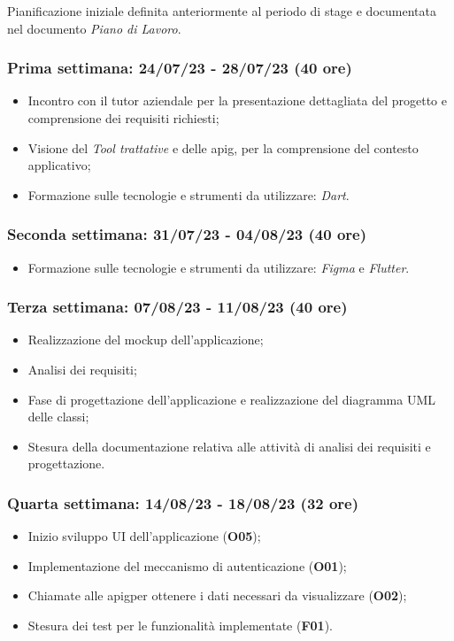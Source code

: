 Pianificazione iniziale definita anteriormente al periodo di stage e documentata nel documento \emph{Piano di Lavoro}.\\

\subsubsection{Prima settimana: 24/07/23 - 28/07/23 (40 ore)}
    \begin{itemize}
        \item Incontro con il tutor aziendale per la presentazione dettagliata del progetto e comprensione dei requisiti richiesti;
        \item Visione del \emph{Tool trattative} e delle \gls{apig}\glsoccur, per la comprensione del contesto applicativo;
        \item Formazione sulle tecnologie e strumenti da utilizzare: \emph{Dart}\cite{site:dart}.
    \end{itemize}
\subsubsection{Seconda settimana: 31/07/23 - 04/08/23 (40 ore)}
    \begin{itemize}
        \item Formazione sulle tecnologie e strumenti da utilizzare: \emph{Figma}\cite{site:figma} e \emph{Flutter}\cite{site:flutter}.
    \end{itemize}
\subsubsection{Terza settimana: 07/08/23 - 11/08/23 (40 ore)}
    \begin{itemize}
        \item Realizzazione del \gls{mockup} dell'applicazione;
        \item Analisi dei requisiti;
        \item Fase di progettazione dell'applicazione e realizzazione del diagramma UML delle classi;
        \item Stesura della documentazione relativa alle attività di analisi dei requisiti e progettazione.
    \end{itemize}
\subsubsection{Quarta settimana: 14/08/23 - 18/08/23 (32 ore)}
    \begin{itemize}
        \item Inizio sviluppo UI dell'applicazione (\textbf{O05});
        \item Implementazione del meccanismo di autenticazione (\textbf{O01});
        \item Chiamate alle \gls{apig}\glsoccur per ottenere i dati necessari da visualizzare (\textbf{O02});
        \item Stesura dei test per le funzionalità implementate (\textbf{F01}).
    \end{itemize}
